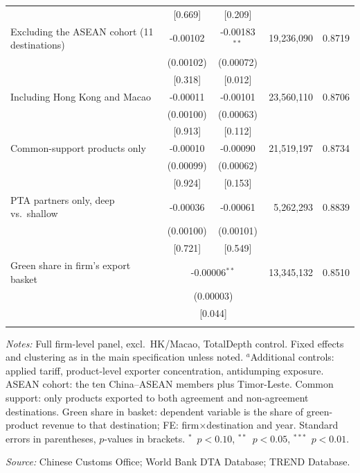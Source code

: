 \begin{table}[htbp]
\begin{threeparttable}
\begin{tabular}{lccrc}
 & [0.669] & [0.209] & & \\
\addlinespace
Excluding the ASEAN cohort (11 destinations) & -0.00102 & -0.00183$^{**}$ & 19,236,090 & 0.8719 \\
 & (0.00102) & (0.00072) & & \\
 & [0.318] & [0.012] & & \\
\addlinespace
Including Hong Kong and Macao & -0.00011 & -0.00101 & 23,560,110 & 0.8706 \\
 & (0.00100) & (0.00063) & & \\
 & [0.913] & [0.112] & & \\
\addlinespace
Common-support products only & -0.00010 & -0.00090 & 21,519,197 & 0.8734 \\
 & (0.00099) & (0.00062) & & \\
 & [0.924] & [0.153] & & \\
\addlinespace
PTA partners only, deep vs.\ shallow & -0.00036 & -0.00061 & 5,262,293 & 0.8839 \\
 & (0.00100) & (0.00101) & & \\
 & [0.721] & [0.549] & & \\
\addlinespace
Green share in firm's export basket & \multicolumn{2}{c}{-0.00006$^{**}$} & 13,345,132 & 0.8510 \\
 & \multicolumn{2}{c}{(0.00003)} & & \\
 & \multicolumn{2}{c}{[0.044]} & & \\
\addlinespace
\bottomrule
\end{tabular}
\begin{tablenotes}[flushleft]\footnotesize
\item \emph{Notes:} Full firm-level panel, excl.\ HK/Macao, TotalDepth control. Fixed effects and clustering as in the main specification unless noted. $^{a}$Additional controls: applied tariff, product-level exporter concentration, antidumping exposure. ASEAN cohort: the ten China--ASEAN members plus Timor-Leste. Common support: only products exported to both agreement and non-agreement destinations. Green share in basket: dependent variable is the share of green-product revenue to that destination; FE: firm$\times$destination and year. Standard errors in parentheses, $p$-values in brackets. $^{*}$~$p<0.10$, $^{**}$~$p<0.05$, $^{***}$~$p<0.01$.
\item \textit{Source:} Chinese Customs Office; World Bank DTA Database; TREND Database.
\end{tablenotes}
\end{threeparttable}
\end{table}
